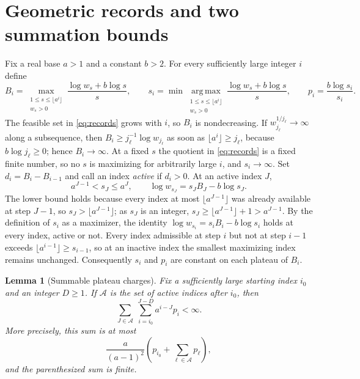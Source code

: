 \documentclass[11pt]{amsart}
\newtheorem{lemma}[theorem]{Lemma}
\theoremstyle{remark}\newtheorem{remark}[theorem]{Remark}
\begin{document}
\section{Geometric records and two summation bounds}\label{sec:records}
Fix a real base $a>1$ and a constant $b>2$. For every sufficiently large
integer $i$ define
\begin{equation}\label{eq:records}
 B_i=\max_{\substack{1\le s\le\lfloor a^i\rfloor\\w_s>0}}
       \frac{\log w_s+b\log s}{s},\qquad
 s_i=\min\operatorname*{arg\,max}_{\substack{1\le s\le\lfloor a^i\rfloor\\ w_s>0}}
       \frac{\log w_s+b\log s}{s},
 \qquad p_i=\frac{b\log s_i}{s_i}.
\end{equation}
The feasible set in \eqref{eq:records} grows with $i$, so $B_i$ is
nondecreasing. If $w_{j_\ell}^{1/j_\ell}\to\infty$ along a subsequence, then
$B_i\ge j_\ell^{-1}\log w_{j_\ell}$ as soon as $\lfloor a^i\rfloor\ge j_\ell$,
because $b\log j_\ell\ge0$; hence $B_i\to\infty$. At a fixed $s$ the quotient in
\eqref{eq:records} is a fixed finite number, so no $s$ is maximizing for
arbitrarily large $i$, and $s_i\to\infty$.
Set $d_i=B_i-B_{i-1}$ and call an index \emph{active} if $d_i>0$. At an
active index $J$,
\begin{equation}\label{eq:active}
 a^{J-1}<s_J\le a^J,\qquad
 \log w_{s_J}=s_JB_J-b\log s_J.
\end{equation}
The lower bound holds because every index at most $\lfloor a^{J-1}\rfloor$ was
already available at step $J-1$, so $s_J>\lfloor a^{J-1}\rfloor$; as $s_J$ is an
integer, $s_J\ge\lfloor a^{J-1}\rfloor+1>a^{J-1}$. By the definition of $s_i$ as
a maximizer, the identity $\log w_{s_i}=s_iB_i-b\log s_i$ holds at every index,
active or not. Every index admissible at step $i$ but not at step $i-1$ exceeds
$\lfloor a^{i-1}\rfloor\ge s_{i-1}$, so at an inactive index the smallest
maximizing index remains unchanged. Consequently $s_i$ and $p_i$ are constant
on each plateau of $B_i$.

\begin{lemma}[Summable plateau charges]\label{lem:plateau}
Fix a sufficiently large starting index $i_0$ and an integer $D\ge1$.
If $\mathcal A$ is the set of active indices after $i_0$, then
\begin{equation}\label{eq:plateausum}
 \sum_{J\in\mathcal A}\ \sum_{i=i_0}^{J-D} a^{i-J}p_i<\infty.
\end{equation}
More precisely, this sum is at most
\[
 \frac{a}{(a-1)^2}
 \left(p_{i_0}+\sum_{\ell\in\mathcal A}p_\ell\right),
\]
and the parenthesized sum is finite.
\end{lemma}
\end{document}

